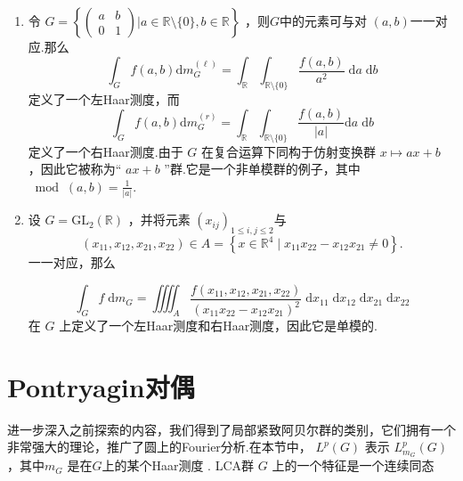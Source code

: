 \documentclass[lang=cn,a4paper,11pt,openany,scheme=chinese]{elegantbook}
\renewcommand{\leq}{\leqslant}
\begin{document}
\begin{instance}
\begin{enumerate}
        \[
        {\int }_{\mathbb{C}\setminus \{ 0\} }f\left( z\right) \mathrm{d}{m}_{G}\left( z\right)  = {\iint }_{{\mathbb{R}}^{2}\setminus \{ \left( {0,0}\right) \} }\frac{f\left( {x + \mathrm{i}y}\right) }{{x}^{2} + {y}^{2}}\mathrm{\;d}x\mathrm{\;d}y.
        \]
        \item 令 \(G = \left\{  {\left( \begin{array}{ll} a & b \\  0 & 1 \end{array}\right)  \Biggl|  a \in  \mathbb{R}\setminus \{ 0\} ,b \in  \mathbb{R}}\right\}\) ，则\(G\)中的元素可与对 \(\left( {a,b}\right)\)一一对应.那么
        \[
        {\int }_{G}f\left( {a,b}\right) \mathrm{d}{m}_{G}^{\left( \ell \right) } = {\int }_{\mathbb{R}}{\int }_{\mathbb{R}\setminus \{ 0\} }\frac{f\left( {a,b}\right) }{{a}^{2}}\mathrm{\;d}a\mathrm{\;d}b
        \]
        定义了一个左Haar测度，而
        \[
        {\int }_{G}f\left( {a,b}\right) \mathrm{d}{m}_{G}^{\left( r\right) } = {\int }_{\mathbb{R}}{\int }_{\mathbb{R}\setminus \{ 0\} }\frac{f\left( {a,b}\right) }{\left| a\right| }\mathrm{d}a\mathrm{\;d}b
        \]
        定义了一个右Haar测度.由于 \(G\) 在复合运算下同构于仿射变换群 \(x \mapsto  {ax} + b\) ，因此它被称为“ \({ax} + b\) ”群.它是一个非单模群的例子，其中 \({\;\operatorname{mod}\;\left( {a,b}\right) } = \frac{1}{\left| a\right| }\).
        \item 设 \(G = {\mathrm{{GL}}}_{2}\left( \mathbb{R}\right)\) ，并将元素 \({\left( {x}_{ij}\right) }_{1 \leq  i,j \leq  2}\)与
        \[
        \left( {{x}_{11},{x}_{12},{x}_{21},{x}_{22}}\right)  \in  A = \left\{ x\in  {\mathbb{R}}^{4} \mid  {x}_{11}{x}_{22} - {x}_{12}{x}_{21} \neq  0\right\}  .
        \]
        一一对应，那么

        \[
        {\int }_{G}f\mathrm{\;d}{m}_{G} = {\iiiint }_{A}\frac{f\left( {{x}_{11},{x}_{12},{x}_{21},{x}_{22}}\right) }{{\left( {x}_{11}{x}_{22} - {x}_{12}{x}_{21}\right) }^{2}}\mathrm{\;d}{x}_{11}\mathrm{\;d}{x}_{12}\mathrm{\;d}{x}_{21}\mathrm{\;d}{x}_{22}
        \]
        在 \(G\) 上定义了一个左Haar测度和右Haar测度，因此它是单模的.
    \end{enumerate}
\end{instance}


\section{Pontryagin对偶}

进一步深入之前探索的内容，我们得到了局部紧致阿贝尔群的类别，它们拥有一个非常强大的理论，推广了圆上的Fourier分析.在本节中， \({L}^{p}\left( G\right)\) 表示 \({L}_{{m}_{G}}^{p}\left( G\right)\) ，其中\({m}_{G}\) 是在\(G\)上的某个Haar测度 .
LCA群 \(G\) 上的一个特征是一个连续同态
\end{document}
